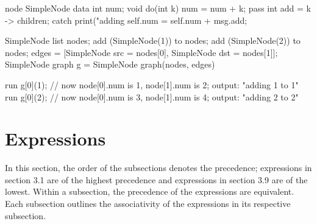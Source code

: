 \documentclass{article}
\begin{document}
node SimpleNode{
    data{
   	 int num;
    }
    void do(int k){
   	 num = num + k;
   	 pass {int add = k} -> children;
    }
    catch{
   	 print("adding %
   	 self.num = self.num + msg.add;
    }
}

SimpleNode list nodes;
add (SimpleNode(1)) to nodes;
add (SimpleNode(2)) to nodes;
edges = [{SimpleNode src = nodes[0], SimpleNode dst = nodes[1]}];
SimpleNode graph g = SimpleNode graph(nodes, edges)

run g[0](1); // now node[0].num is 1, node[1].num is 2; output: "adding 1 to 1" 
run g[0](2); // now node[0].num is 3, node[1].num is 4; output: "adding 2 to 2"
\section{Expressions} %
In this section, the order of the subsections denotes the precedence; expressions in section 3.1 are of the highest precedence and expressions in section 3.9 are of the lowest. Within a subsection, the precedence of the expressions are equivalent. Each subsection outlines the associativity of the expressions in its respective subsection.
\end{document}
